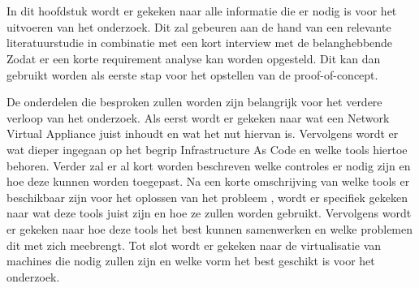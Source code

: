 \chapter{}%
\label{ch:stand-van-zaken}

In dit hoofdstuk wordt er gekeken naar alle informatie die er nodig is voor het uitvoeren van het onderzoek. Dit zal gebeuren aan de hand van een relevante literatuurstudie in combinatie met een kort interview met de belanghebbende Zodat er een korte requirement analyse kan worden opgesteld. Dit kan dan gebruikt worden als eerste stap voor het opstellen van de proof-of-concept. \newline

De onderdelen die besproken zullen worden zijn belangrijk voor het verdere verloop van het onderzoek. Als eerst wordt er gekeken naar wat een Network Virtual Appliance juist inhoudt en wat het nut hiervan is. Vervolgens wordt er wat dieper ingegaan op het begrip Infrastructure As Code en welke tools hiertoe behoren. Verder zal er al kort worden beschreven welke controles er nodig zijn en hoe deze kunnen worden toegepast. Na een korte omschrijving van welke tools er beschikbaar zijn voor het oplossen van het probleem , wordt er specifiek gekeken naar wat deze tools juist zijn en hoe ze zullen worden gebruikt. Vervolgens wordt er gekeken naar hoe deze tools het best kunnen samenwerken en welke problemen dit met zich meebrengt. Tot slot wordt er gekeken naar de virtualisatie van machines die nodig zullen zijn en welke vorm het best geschikt is voor het onderzoek.




